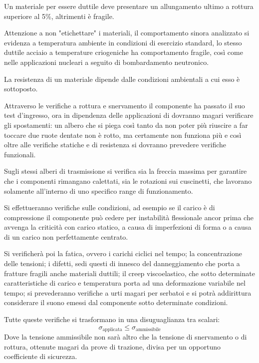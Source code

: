 \documentclass{article}
\begin{document}
\begin{adjustwidth}{2in}{}
		 Un materiale per essere duttile deve presentare un allungamento ultimo a rottura superiore al 5\%, altrimenti è fragile. \newline 
		 
		 Attenzione a non "etichettare" i materiali, il comportamento sinora analizzato si evidenza a temperatura ambiente in condizioni di esercizio standard, lo stesso duttile acciaio a temperature criogeniche ha comportamento fragile, così come nelle applicazioni nucleari a seguito di bombardamento neutronico.  
		 
		 La resistenza di un materiale dipende dalle condizioni ambientali a cui esso è sottoposto. \newline
		 
		 Attraverso le verifiche a rottura e snervamento il componente ha passato il suo test d'ingresso, ora in dipendenza delle applicazioni di dovranno magari verificare gli spostamenti: un albero che si piega così tanto da non poter più riuscire a far toccare due ruote dentate non è rotto, ma certamente non funziona più e così oltre alle verifiche statiche e di resistenza si dovranno prevedere verifiche funzionali. \newline 
		 
		 Sugli stessi alberi di trasmissione si verifica sia la freccia massima per garantire che i componenti rimangano calettati, sia le rotazioni sui cuscinetti, che lavorano solamente all'interno di uno specifico range di funzionamento. 
		 
		 Si effettueranno verifiche sulle condizioni, ad esempio se il carico è di compressione il componente può cedere per instabilità flessionale ancor prima che avvenga la criticità con carico statico, a causa di imperfezioni di forma o a causa di un carico non perfettamente centrato. 
		 
		 Si verificherà poi la fatica, ovvero i carichi ciclici nel tempo; la concentrazione delle tensioni; i difetti, sedi questi di innesco del danneggiamento che porta a fratture fragili anche materiali duttili; il creep viscoelastico, che sotto determinate caratteristiche di carico e temperatura porta ad una deformazione variabile nel tempo; si prevederanno verifiche a urti magari per serbatoi e si potrà addirittura considerare il suono emessi dal componente sotto determinate condizioni. \newline 
		 
		 Tutte queste verifiche si trasformano in una disuguaglianza tra scalari:
		 \[\sigma_{\text{applicata}}\leq \sigma_{\text{ammissibile}}\]
		 Dove la tensione ammissibile non sarà altro che la tensione di snervamento o di rottura, ottenute magari da prove di trazione, divisa per un opportuno coefficiente di sicurezza.\newline 
		 

\end{adjustwidth}
\end{document}
